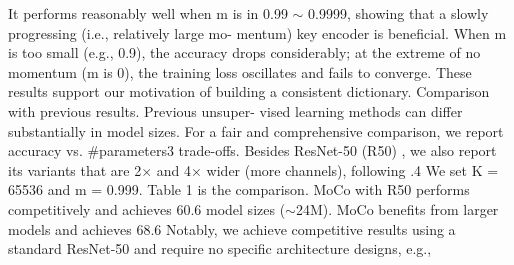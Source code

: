 \documentclass[10pt,twocolumn]{article}  %
\begin{document}
It performs reasonably well when m is in 0.99 $\sim $ 0.9999,
showing that a slowly progressing (i.e., relatively large mo-
mentum) key encoder is beneﬁcial. When m is too small
(e.g., 0.9), the accuracy drops considerably; at the extreme
of no momentum (m is 0), the training loss oscillates and
fails to converge. These results support our motivation of
building a consistent dictionary.
Comparison with previous results. Previous unsuper-
vised learning methods can differ substantially in model
sizes. For a fair and comprehensive comparison, we report
accuracy vs. \#parameters3 trade-offs. Besides ResNet-50
(R50) \cite{33_he2016deep}, we also report its variants that are 2$\times $ and 4$\times $
wider (more channels), following \cite{38_he2017maskrcnn}.4 We set K = 65536
and m = 0.999. Table 1 is the comparison.
MoCo with R50 performs competitively and achieves
60.6%
model sizes ($\sim $24M). MoCo beneﬁts from larger models and
achieves 68.6%
Notably, we achieve competitive results using a standard
ResNet-50 and require no speciﬁc architecture designs, e.g.,
\end{document}
